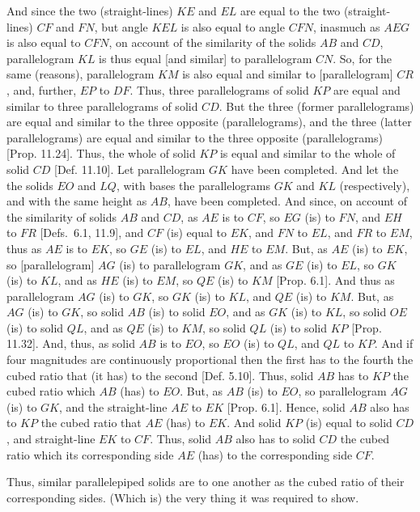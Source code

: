 \begin{Parallel}{}{}
{And since the two (straight-lines) $KE$ and $EL$ are equal to the
two (straight-lines) $CF$ and $FN$, but angle $KEL$ is also
equal to angle $CFN$, inasmuch as $AEG$ is also equal to $CFN$,
on account of the similarity of the solids $AB$ and $CD$, parallelogram
$KL$ is thus equal [and similar] to parallelogram $CN$. So,
for the same (reasons), parallelogram $KM$ is also  equal and similar to
[parallelogram] $CR$, and, further, $EP$ to $DF$. Thus,
three parallelograms of solid $KP$ are equal and similar to three
parallelograms of solid $CD$. But the three (former parallelograms) are equal and
similar to the three opposite (parallelograms), and the three (latter parallelograms)
are equal and similar to the three opposite (parallelograms) 
[Prop. 11.24]. Thus, the whole of solid $KP$
is equal and similar to the whole of solid $CD$ [Def. 11.10]. Let parallelogram $GK$ have been completed. And
let the the solids $EO$ and $LQ$, with bases the parallelograms
$GK$ and $KL$ (respectively), and with the same height as $AB$, have been completed. And since, on account of the similarity of solids $AB$ and $CD$, 
as $AE$ is to $CF$, so $EG$ (is) to $FN$,  and $EH$  to $FR$ [Defs.~6.1, 11.9],
and $CF$ (is) equal to $EK$, and $FN$ to $EL$, and $FR$ to $EM$, 
thus as $AE$ is to $EK$, so $GE$ (is) to $EL$, and $HE$ to $EM$. But,
as $AE$ (is) to $EK$, so [parallelogram] $AG$ (is) to parallelogram
$GK$, and as $GE$ (is) to $EL$, so $GK$ (is) to $KL$,
and as $HE$ (is) to $EM$, so $QE$ (is) to $KM$ [Prop. 6.1]. And thus as parallelogram $AG$ (is) to $GK$, so $GK$
(is) to $KL$, and $QE$ (is) to $KM$. But, as $AG$
(is) to $GK$, so solid $AB$ (is) to solid $EO$, and as $GK$ (is) to $KL$,
so solid $OE$ (is) to  solid $QL$, and as $QE$ (is) to $KM$, so solid
$QL$ (is) to solid $KP$ [Prop. 11.32].
And, thus, as solid $AB$ is to $EO$, so $EO$ (is) to $QL$, and
$QL$ to $KP$.
And if four magnitudes are continuously proportional then the first has to
the fourth the cubed ratio that (it has) to the second [Def. 5.10].  Thus, solid $AB$ has to $KP$ the 
cubed ratio
which $AB$ (has) to $EO$. 
But, as $AB$ (is) to $EO$, so parallelogram $AG$
(is) to $GK$, and the straight-line $AE$ to $EK$ [Prop. 6.1]. Hence, 
solid $AB$ also has to $KP$ the cubed ratio  that $AE$ (has) to
$EK$. And solid $KP$ (is) equal to solid $CD$, and straight-line $EK$ to
$CF$.  Thus, solid $AB$ also has to solid $CD$ the cubed ratio
which its corresponding side $AE$ (has) to the corresponding side
$CF$.

\epsfysize=2.5in
\centerline{}

Thus, similar parallelepiped solids are to one another
as the cubed ratio of  their corresponding sides. (Which is) the very thing it
was required to show.}
\end{Parallel}

